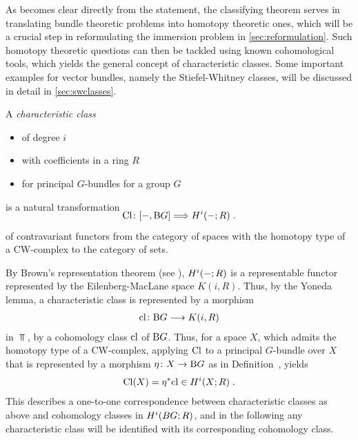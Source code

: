 As becomes clear directly from the statement, the classifying
theorem serves in translating bundle theoretic problems into homotopy
theoretic ones, which will be a crucial step in reformulating the
immersion problem in \autoref{sec:reformulation}.
Such homotopy theoretic questions can then be tackled using known
cohomological tools, which yields the general concept of
characteristic classes.
Some important examples for vector bundles, namely the
Stiefel-Whitney classes, will be discussed in detail in
\autoref{sec:swclasses}.
\begin{Def}
  A \emph{characteristic class}
  \begin{itemize}
  \item of degree $i$
  \item with coefficients in a ring $R$
  \item for principal $G$-bundles for a group $G$
  \end{itemize}
  is a natural transformation
  \begin{gather*}
    \SwapAboveDisplaySkip
    \Cl\colon [-, \BG] \Longrightarrow \H^i(-; R)\;.
  \end{gather*}
  of contravariant functors from the category of spaces with the
  homotopy type of a CW-complex to the category of sets.
\end{Def}
\begin{Rem}
  By Brown's representation theorem
  (see \forexample \cite[Chap.~4.E]{hatcher}),
  $H^i(-;R)$ is a representable functor represented by the
  Eilenberg-MacLane space $K(i,R)$.
  Thus, by the Yoneda lemma, a characteristic class is
  represented by a morphism
  \begin{gather*}
    \mathrm{cl}\colon \mathrm{B}G \longrightarrow K(i, R)
  \end{gather*}
  in $\Top$, \idest by a cohomology class $\mathrm{cl}$ of $\mathrm{B}G$.
  Thus, for a space $X$, which admits the homotopy type of a
  CW-complex, 
  applying $\mathrm{Cl}$ to a principal $G$-bundle over $X$ that is
  represented by a morphism $\eta\colon X\to\mathrm{B}G$
  as in Definition~,
  yields
  \begin{gather*}
    \mathrm{Cl}(X) = {\eta}^* \mathrm{cl} \in H^i(X;R)
    \;.
  \end{gather*}
  This describes a one-to-one correspondence between
  characteristic classes as above and cohomology classes in
  $H^i(BG;R)$, and in the following any characteristic class will be
  identified with its corresponding cohomology class.
\end{Rem}

